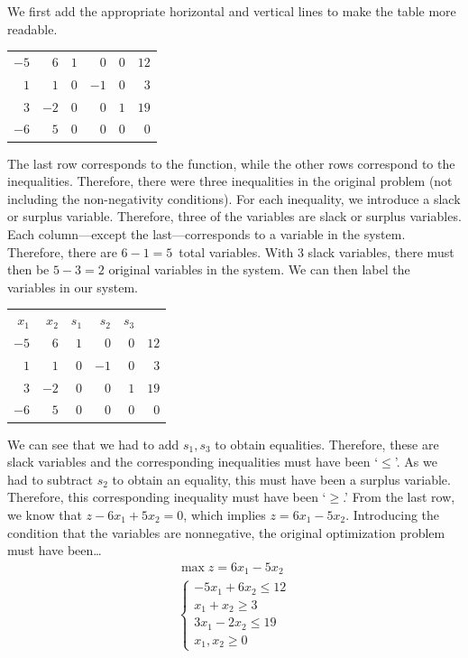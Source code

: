 \documentclass[12pt,letterpaper]{exam}
\begin{document}
\begin{questions}
\sol We first add the appropriate horizontal and vertical lines to make the table more readable. \par
	\begin{table}[H]
	\centering
	\begin{tabular}{rrrrr|r}
	$-5$ & $6$ & $1$ & $0$ & $0$ & $12$ \\
	$1$ & $1$ & $0$ & $-1$ & $0$ & $3$ \\
	$3$ & $-2$ & $0$ & $0$ & $1$ & $19$ \\ \hline
	$-6$ & $5$ & $0$ & $0$ & $0$ & $0$ 
	\end{tabular}
	\end{table} \par
The last row corresponds to the function, while the other rows correspond to the inequalities. Therefore, there were three inequalities in the original problem (not including the non-negativity conditions). For each inequality, we introduce a slack or surplus variable. Therefore, three of the variables are slack or surplus variables. Each column---except the last---corresponds to a variable in the system. Therefore, there are $6 - 1= 5$~total variables. With 3 slack variables, there must then be $5 - 3= 2$ original variables in the system. We can then label the variables in our system. \par
	\begin{table}[H]
	\centering
	\begin{tabular}{rrrrrr}
	{\footnotesize $x_1$} & {\footnotesize $x_2$} & {\footnotesize $s_1$} & {\footnotesize $s_2$} & {\footnotesize $s_3$} & \\
	$-5$ & $6$ & $1$ & $0$ & \multicolumn{1}{r|}{$0$} & $12$ \\
	$1$ & $1$ & $0$ & $-1$ & \multicolumn{1}{r|}{$0$} & $3$ \\
	$3$ & $-2$ & $0$ & $0$ & \multicolumn{1}{r|}{$1$} & $19$ \\ \hline
	$-6$ & $5$ & $0$ & $0$ & \multicolumn{1}{r|}{$0$} & $0$ 
	\end{tabular}
	\end{table} \par
We can see that we had to add $s_1, s_3$ to obtain equalities. Therefore, these are slack variables and the corresponding inequalities must have been `$\leq$'. As we had to subtract $s_2$ to obtain an equality, this must have been a surplus variable. Therefore, this corresponding inequality must have been `$\geq$.' From the last row, we know that $z - 6x_1 + 5x_2= 0$, which implies $z= 6x_1 - 5x_2$. Introducing the condition that the variables are nonnegative, the original optimization problem must have been\dots
	\[
	\begin{gathered}
	\max z= 6x_1 - 5x_2 \\
	\begin{cases}
	-5x_1 + 6x_2 \leq 12 \\
	x_1 + x_2 \geq 3 \\
	3x_1 - 2x_2 \leq 19 \\
	x_1, x_2 \geq 0
	\end{cases}
	\end{gathered}
	\] 




\end{questions}
\end{document}
